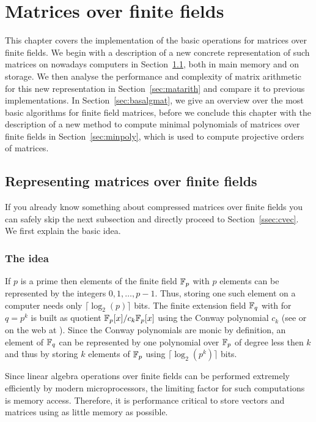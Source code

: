 
\chapter{Matrices over finite fields}

This chapter covers the implementation of the basic operations for matrices 
over finite fields. We begin with a description of a new concrete 
representation of such matrices on nowadays computers in 
Section~\ref{sec:ffematrices}, both in main memory and on storage.
We then analyse the performance and complexity of matrix arithmetic 
for this new representation in Section~\ref{sec:matarith} and compare
it to previous implementations. In Section~\ref{sec:basalgmat}, we give
an overview over the most basic algorithms for finite field matrices,
before we conclude this chapter with the description of a new method
to compute minimal polynomials of matrices over finite fields in
Section~\ref{sec:minpoly}, which is used to compute projective orders
of matrices.

\section{Representing matrices over finite fields}
\label{sec:ffematrices}

If you already know something about compressed matrices over finite
fields you can safely skip the next subsection and directly proceed
to Section~\ref{ssec:cvec}. We first explain the basic idea.

\subsection{The idea}

If $p$ is a prime then elements of the finite field $\mathbb{F}_p$ with $p$
elements can be represented by the integers $0, 1, \ldots, p-1$. Thus,
storing one such element on a computer needs only $\lceil \log_2(p)
\rceil$ bits. The finite extension field  $\mathbb{F}_q$ with for $q = p^k$ is built
as quotient $\mathbb{F}_p[x]/c_k \mathbb{F}_p[x]$ using the Conway polynomial
$c_k$ (see \cite{Nickel} or on the web at \cite{ConwayFL}). Since the
Conway polynomials are monic by definition, an element
of $\mathbb{F}_q$ can be represented by one polynomial over $\mathbb{F}_p$ of degree 
less then $k$ and thus by storing $k$ elements of $\mathbb{F}_p$ using $\lceil
\log_2(p^k) \rceil$ bits.

Since linear algebra operations over finite fields can be performed
extremely efficiently by modern microprocessors, the limiting factor 
for such computations is memory access. Therefore, it is performance
critical to store vectors and matrices using as little memory as possible.

